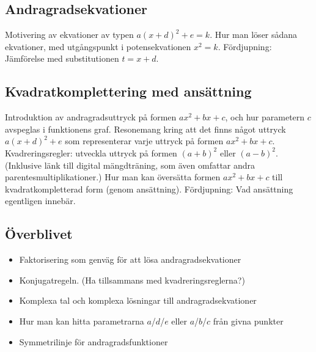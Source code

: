 \documentclass[12pt]{article}
\begin{document}
  \subsection{Andragradsekvationer}
  Motivering av ekvationer av typen $a(x+d)^2+e=k$.
  Hur man löser sådana ekvationer, med utgångspunkt i potensekvationen $x^2 = k$.
  Fördjupning: Jämförelse med substitutionen $t=x+d$.

  \subsection{Kvadratkomplettering med ansättning}
  Introduktion av andragradsuttryck på formen $ax^2+bx+c$, och hur parametern $c$ avspeglas i funktionens graf.
  Resonemang kring att det finns något uttryck $a(x+d)^2+e$ som representerar varje uttryck på formen $ax^2+bx+c$.
  Kvadreringsregler: utveckla uttryck på formen $(a+b)^2$ eller $(a-b)^2$.
  (Inklusive länk till digital mängdträning, som även omfattar andra parentesmultiplikationer.)
  Hur man kan översätta formen $ax^2+bx+c$ till kvadratkompletterad form (genom ansättning).
  Fördjupning: Vad ansättning egentligen innebär.
  
  \subsection{Överblivet}
  \begin{itemize}
    \item Faktorisering som genväg för att lösa andragradsekvationer
    \item Konjugatregeln. (Ha tillsammans med kvadreringsreglerna?)
    \item Komplexa tal och komplexa lösningar till andragradsekvationer
    \item Hur man kan hitta parametrarna $a$/$d$/$e$ eller $a$/$b$/$c$ från givna punkter
    \item Symmetrilinje för andragradsfunktioner
  \end{itemize}
\end{document}
